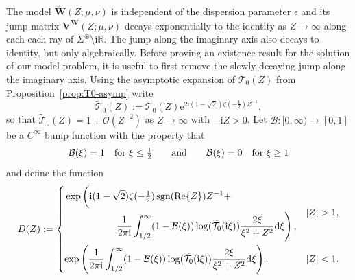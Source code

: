 \documentclass[12pt]{amsart}
\numberwithin{equation}{section}
\newcommand{\dd}{\mathrm{d}}
\newcommand{\ee}{\mathrm{e}}
\newcommand{\ii}{\mathrm{i}}
\newcommand{\R}{\mathbb{R}}
\newcommand{\eps}{\epsilon}
\newcommand{\bigo}[1]{ \mathcal{O}\! \left( #1 \right) }
\DeclareMathOperator{\sgn}{sgn}
\renewcommand{\Re}{\operatorname{Re}}
\begin{document}
The model $\breve{\mathbf{W}}(Z;\mu,\nu)$ is independent of the dispersion parameter $\eps$ and its jump matrix $\mathbf{V}^{\breve{\mathbf{W}}}(Z;\mu,\nu)$ decays exponentially to the identity as $Z \to \infty$ along each each ray of $\Sigma^\circledast \setminus \ii\R$. The jump along the imaginary axis also decays to identity, but only algebraically.  Before proving an existence result for the solution of our model problem, it is useful to first remove the slowly decaying jump along the imaginary axis.  
Using the asymptotic expansion of $\mathcal{T}_0(Z)$ from Proposition~\ref{prop:T0-asymp} write
\begin{equation}
	\widetilde{\mathcal{T}}_0(Z) := \mathcal{T}_0(Z) \ee^{2\ii (1-\sqrt{2}) \zeta(-\frac{1}{2}) Z^{-1}}, 
	\label{eq:T0-tilde-def}
\end{equation}
so that $\widetilde{\mathcal{T}}_0(Z) = 1+ \bigo{Z^{-2}}$ as $Z \to \infty$ with $-\ii Z >0$. 
Let $\mathcal{B}:[0,\infty) \to [0,1]$ be a $C^\infty$ bump function with the property that 
\begin{equation}
	\mathcal{B}(\xi) = 1 \text{\quad for } \xi \leq \tfrac{1}{2}
	\qquad \text{and} \qquad 
	\mathcal{B}(\xi) = 0 \text{\quad for } \xi\geq 1
\end{equation}
and define the function 
\begin{align}
	D(Z) := \begin{dcases}
	\begin{multlined}[.7\textwidth] \exp \left( \vphantom{\int_0^\infty\frac{2\xi}{\xi^2+Z^2}}\ii (1-\sqrt{2}) \zeta(-\tfrac{1}{2})  \sgn(\Re\{Z\}) Z^{-1} + \right. \\ \left. 
	    \frac{1}{2\pi \ii} \int_{1/2}^\infty   (1-\mathcal{B}(\xi ) ) \log( \widetilde{\mathcal{T}}_0(\ii \xi))  \frac{ 2 \xi}{\xi^2+Z^2}\dd \xi \right),
	\end{multlined} 
	& |Z| > 1, \\		
	 \exp \left( \frac{1}{2\pi \ii} \int_{1/2}^\infty  (1-\mathcal{B}(\xi ) ) \log( \widetilde{\mathcal{T}}_0(\ii \xi))\frac{2 \xi }{\xi^2+Z^2}\dd \xi \right), 
	&|Z| < 1.
	\label{eq:D-def}
\end{dcases}
\end{align}
\end{document}
